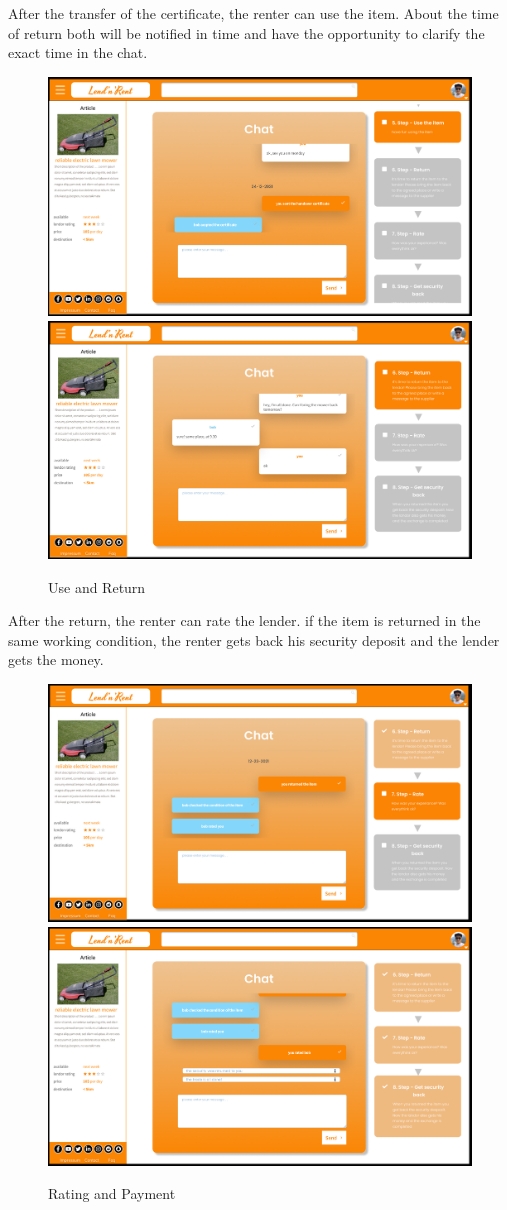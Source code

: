 \newpage
\noindent
After the transfer of the certificate, the renter can use the item. About the time of return both will be notified in time and have the opportunity to clarify the exact time in the chat.

\begin{figure}[H]
	\centering
	\includegraphics[width=0.49\linewidth]{abb/17step5}
	\includegraphics[width=0.49\linewidth]{abb/18step6}
	\caption{Use and Return}
	\label{fig:Negotiation4}
	\centering
\end{figure}

\noindent
After the return, the renter can rate the lender. if the item is returned in the same working condition, the renter gets back his security deposit and the lender gets the money.

\begin{figure}[H]
	\centering
	\includegraphics[width=0.49\linewidth]{abb/19step7}
	\includegraphics[width=0.49\linewidth]{abb/20steplast}
	\caption{Rating and Payment}
	\label{fig:Negotiation5}
	\centering
\end{figure}

